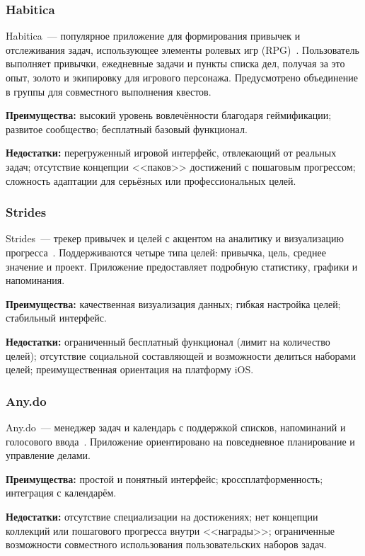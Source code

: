 \documentclass[../main.tex]{subfiles}
\begin{document}
\subsubsection{Habitica}

Habitica~--- популярное приложение для формирования привычек и отслеживания задач, использующее элементы ролевых игр (RPG)~\cite{habitica}. Пользователь выполняет привычки, ежедневные задачи и пункты списка дел, получая за это опыт, золото и экипировку для игрового персонажа. Предусмотрено объединение в группы для совместного выполнения квестов.

\textbf{Преимущества:} высокий уровень вовлечённости благодаря геймификации; развитое сообщество; бесплатный базовый функционал.

\textbf{Недостатки:} перегруженный игровой интерфейс, отвлекающий от реальных задач; отсутствие концепции <<паков>> достижений с пошаговым прогрессом; сложность адаптации для серьёзных или профессиональных целей.

\subsubsection{Strides}

Strides~--- трекер привычек и целей с акцентом на аналитику и визуализацию прогресса~\cite{strides}. Поддерживаются четыре типа целей: привычка, цель, среднее значение и проект. Приложение предоставляет подробную статистику, графики и напоминания.

\textbf{Преимущества:} качественная визуализация данных; гибкая настройка целей; стабильный интерфейс.

\textbf{Недостатки:} ограниченный бесплатный функционал (лимит на количество целей); отсутствие социальной составляющей и возможности делиться наборами целей; преимущественная ориентация на платформу iOS.

\subsubsection{Any.do}

Any.do~--- менеджер задач и календарь с поддержкой списков, напоминаний и голосового ввода~\cite{anydo}. Приложение ориентировано на повседневное планирование и управление делами.

\textbf{Преимущества:} простой и понятный интерфейс; кроссплатформенность; интеграция с календарём.

\textbf{Недостатки:} отсутствие специализации на достижениях; нет концепции коллекций или пошагового прогресса внутри <<награды>>; ограниченные возможности совместного использования пользовательских наборов задач.
\end{document}
